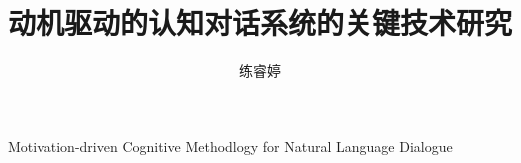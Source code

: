 \author{练睿婷}
\title{动机驱动的认知对话系统的关键技术研究}
{Motivation-driven Cognitive Methodlogy for Natural Language Dialogue}
\chairman{        }
\grantdate{  }{  }
\appraiser{       }

\team{   }
\fundteam{   }
